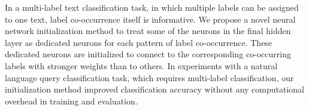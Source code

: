 In a multi-label text classification task, in which multiple labels can be assigned to one text, label co-occurrence itself is informative. We propose a novel neural network initialization method to treat some of the neurons in the final hidden layer as dedicated neurons for each pattern of label co-occurrence. These dedicated neurons are initialized to connect to the corresponding co-occurring labels with stronger weights than to others. In experiments with a natural language query classification task, which requires multi-label classification, our initialization method improved classification accuracy without any computational overhead in training and evaluation.
